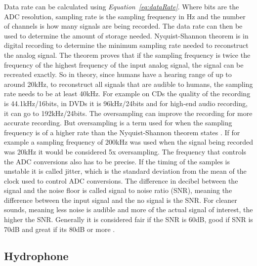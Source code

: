 Data rate can be calculated using \textit{Equation~\ref{eq:dataRate}}.
Where bits are the ADC resolution, sampling rate is the sampling frequency in Hz and the number of channels is how many signals are being recorded.
The data rate can then be used to determine the amount of storage needed.
Nyquist-Shannon theorem is in digital recording to determine the minimum sampling rate needed to reconstruct the analog signal.
The theorem proves that if the sampling frequency is twice the frequency of the highest frequency of the input analog signal, the signal can be recreated exactly.%
So in theory, since humans have a hearing range of up to around 20kHz, to reconstruct all signals that are audible to humans, the sampling rate needs to be at least 40kHz.
For example on CDs the quality of the recording is 44.1kHz/16bits, in DVDs it is 96kHz/24bits and for high-end audio recording, it can go to 192kHz/24bits.
The oversampling can improve the recording for more accurate recording.
But oversampling is a term used for when the sampling frequency is of a higher rate than the Nyquist-Shannon theorem states  \cite{bartlett_practical_2016}.
If for example a sampling frequency of 200kHz was used when the signal being recorded was 20kHz it would be considered 5x oversampling.
The frequency that controls the ADC conversions also has to be precise.
If the timing of the samples is unstable it is called jitter, which is the standard deviation from the mean of the clock used to control ADC conversions.
The difference in decibel between the signal and the noise floor is called signal to noise ratio (SNR), meaning the difference between the input signal and the no signal is the SNR.
For cleaner sounds, meaning less noise is audible and more of the actual signal of interest, the higher the SNR.
Generally it is considered fair if the SNR is 60dB, good if SNR is 70dB and great if its 80dB or more \cite{bartlett_practical_2016}.




\subsection{Hydrophone}

